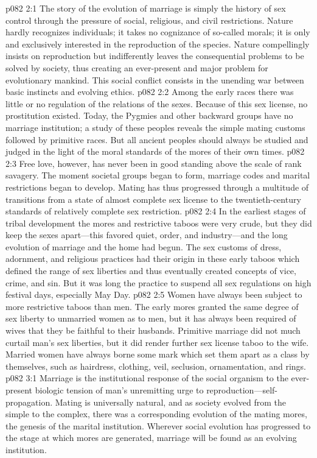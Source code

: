 \vs p082 2:1 The story of the evolution of marriage is simply the history of sex control through the pressure of social, religious, and civil restrictions. Nature hardly recognizes individuals; it takes no cognizance of so\hyp{}called morals; it is only and exclusively interested in the reproduction of the species. Nature compellingly insists on reproduction but indifferently leaves the consequential problems to be solved by society, thus creating an ever\hyp{}present and major problem for evolutionary mankind. This social conflict consists in the unending war between basic instincts and evolving ethics.
\pc \vs p082 2:2 Among the early races there was little or no regulation of the relations of the sexes. Because of this sex license, no prostitution existed. Today, the Pygmies and other backward groups have no marriage institution; a study of these peoples reveals the simple mating customs followed by primitive races. But all ancient peoples should always be studied and judged in the light of the moral standards of the mores of their own times.
\vs p082 2:3 Free love, however, has never been in good standing above the scale of rank savagery. The moment societal groups began to form, marriage codes and marital restrictions began to develop. Mating has thus progressed through a multitude of transitions from a state of almost complete sex license to the twentieth\hyp{}century standards of relatively complete sex restriction.
\vs p082 2:4 In the earliest stages of tribal development the mores and restrictive taboos were very crude, but they did keep the sexes apart---this favored quiet, order, and industry---and the long evolution of marriage and the home had begun. The sex customs of dress, adornment, and religious practices had their origin in these early taboos which defined the range of sex liberties and thus eventually created concepts of vice, crime, and sin. But it was long the practice to suspend all sex regulations on high festival days, especially May Day.
\pc \vs p082 2:5 Women have always been subject to more restrictive taboos than men. The early mores granted the same degree of sex liberty to unmarried women as to men, but it has always been required of wives that they be faithful to their husbands. Primitive marriage did not much curtail man’s sex liberties, but it did render further sex license taboo to the wife. Married women have always borne some mark which set them apart as a class by themselves, such as hairdress, clothing, veil, seclusion, ornamentation, and rings.
\vs p082 3:1 Marriage is the institutional response of the social organism to the ever\hyp{}present biologic tension of man’s unremitting urge to reproduction---self\hyp{}propagation. Mating is universally natural, and as society evolved from the simple to the complex, there was a corresponding evolution of the mating mores, the genesis of the marital institution. Wherever social evolution has progressed to the stage at which mores are generated, marriage will be found as an evolving institution.
